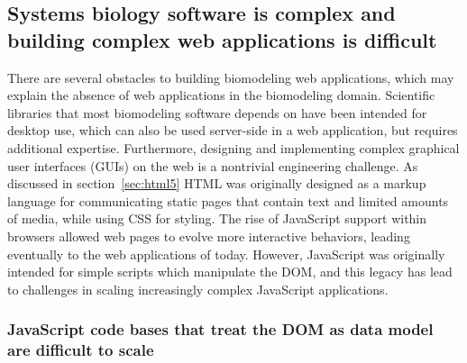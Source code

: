 \subsection{Systems biology software is complex and building complex web applications is difficult}
There are several obstacles to building biomodeling web applications, which may explain the absence of web applications in the biomodeling domain.
Scientific libraries that most biomodeling software depends on have been intended for desktop use, which can also be used server-side in a web application, but requires additional expertise.
Furthermore, designing and implementing complex graphical user interfaces (GUIs) on the web is a nontrivial engineering challenge.
As discussed in section~\ref{sec:html5} HTML was originally designed as a markup language for communicating static pages that contain text and limited amounts of media, while using CSS for styling.
The rise of JavaScript support within browsers allowed web pages to evolve more interactive behaviors, leading eventually to the web applications of today.
However, JavaScript was originally intended for simple scripts which manipulate the DOM, and this legacy has lead to challenges in scaling increasingly complex JavaScript applications.

\subsubsection{JavaScript code bases that treat the DOM as data model are difficult to scale}

